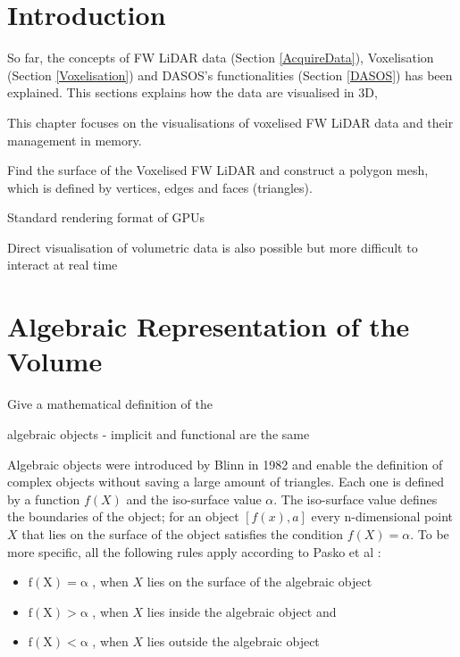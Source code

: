 \documentclass{subfiles}
\begin{document}
	

\section{Introduction}

\par So far, the concepts of FW LiDAR data (Section \ref{AcquireData}), Voxelisation (Section \ref{Voxelisation}) and DASOS's functionalities (Section \ref{DASOS}) has been explained. This sections explains how the data are visualised in 3D,



\par This chapter focuses on the visualisations of voxelised FW LiDAR data and their management in memory.

Find the surface of the Voxelised FW LiDAR and construct a polygon mesh, which is defined by vertices, edges and faces (triangles). 

Standard rendering format of GPUs 

Direct visualisation of volumetric data is also possible but more difficult to interact at real time 





\section{Algebraic Representation of the Volume}

Give a mathematical definition of the 

algebraic objects - implicit and functional are the same 

\par Algebraic objects were introduced by Blinn in 1982 \cite{Blinn1982} and enable the definition of complex objects without saving a large amount of triangles. Each one is defined by a function $ \mathit{f(X)} $ and the iso-surface value $\alpha$. The iso-surface value defines the boundaries of the object; for an object $ [f(x),a]$ every n-dimensional point $ \mathit{X} $  that lies on the surface of the object satisfies the condition $ \mathit{f(X)=\alpha }  $. To be more specific, all the following rules apply according to Pasko et al \cite{Pasko1994}: 
\begin{itemize}
	\item $	\mathrm{f(X) = \alpha }$ , when $X$ lies on the surface of the algebraic object
	\item $	\mathrm{f(X) > \alpha }$ , when $X$ lies inside the algebraic object and
	\item $	\mathrm{f(X) < \alpha }$ , when $X$ lies outside the algebraic object	 
\end{itemize}
\end{document}
